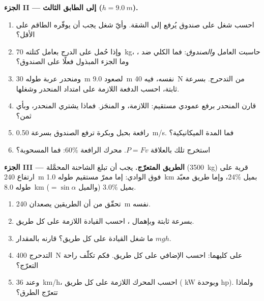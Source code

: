 \begin{problem}
\medskip
\noindent\textbf{الجزء II --- إلى الطابق الثالث ($h = \qty{9.0}{m}$).}
\begin{enumerate}[resume]
  \item احسب شغل  على صندوق يُرفع إلى الشقة.
        وأيّ شغل يجب أن يوفّره الطاقم على الأقل؟
  \item وإذا حُمل على الدرج بعامل كتلته \qty{70}{kg}، حاسبت 
        العامل \emph{والصندوق}: فما  الكلي ضد ، وما
        الجزء المبذول فعلًا على الصندوق؟
  \item ومنحدر عربة طوله \qty{30}{m} لصعود \qty{9.0}{m}
        نفسه، فيه \qty{40}{N} من  التدحرج. بسرعة ثابتة،
        احسب الدفعة اللازمة على امتداد المنحدر وشغلها.
  \item قارن المنحدر برفع عمودي مستقيم:  اللازمة، و
         المنجَز. فماذا يشتري المنحدر، وبأي ثمن؟
  \item رافعة بحبل وبكرة ترفع الصندوق بسرعة \qty{0.50}{m/s}.
        فما المدة  الميكانيكية؟
  \item استخرج تلك  بالعلاقة $P = Fv$.  محرك الرافعة
        $60\%$: فما  المسحوبة؟
\end{enumerate}

\medskip
\noindent\textbf{الجزء III --- الطريق المتعرّج.}
يجب أن تبلغ الشاحنة المحمَّلة (\qty{3500}{kg}) قرية على ارتفاع \qty{240}{m}
فوق الوادي: إما ممرّ مستقيم طوله \qty{1.0}{km} بميل $24\%$، وإما
طريق معبّد طوله \qty{8.0}{km} بميل $3.0\%$ (والميل $= \sin\alpha$).
\begin{enumerate}[resume]
  \item تحقّق من أن الطريقين يصعدان \qty{240}{m} نفسه.
  \item بسرعة ثابتة وبإهمال ، احسب 
        القيادة اللازمة على كل طريق.
  \item ما شغل  القيادة على كل طريق؟ قارنه بالمقدار $mgh$.
  \item {} التدحرج \qty{400}{N} على كليهما: احسب 
        الإضافي على كل طريق. فكم تكلّف راحة التعرّج؟
  \item وعند \qty{36}{km/h}، احسب  المحرك اللازمة على كل
        طريق ( \unit{kW} وبوحدة \unit{hp}). ولماذا تتعرّج الطرق؟
\end{enumerate}


\end{problem}
